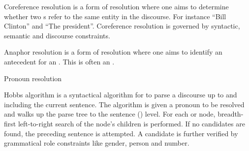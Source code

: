\begin{df}{Coreference resolution}
\sb{} is a form of resolution where one aims to determine whether two s refer to the same entity in the discourse. For instance ``Bill Clinton'' and ``The president''. Coreference resolution is governed by syntactic, semantic and discourse constraints.
\end{df}
\begin{df}{Anaphor resolution}
\sb{} is a form of resolution where one aims to identify an antecedent for an . This is often an .
\end{df}
\begin{df}{Pronoun resolution}

\end{df}
\begin{df}{Hobbs algorithm}
\sb{} is a syntactical algorithm for  to parse a discourse up to and including the current sentence. The algorithm is given a pronoun to be resolved and walks up the parse tree to the sentence () level. For each  or  node, breadth-first left-to-right search of the node's children is performed. If no candidates are found, the preceding sentence is attempted. A candidate is further verified by grammatical role constraints like gender, person and number.
\end{df}
